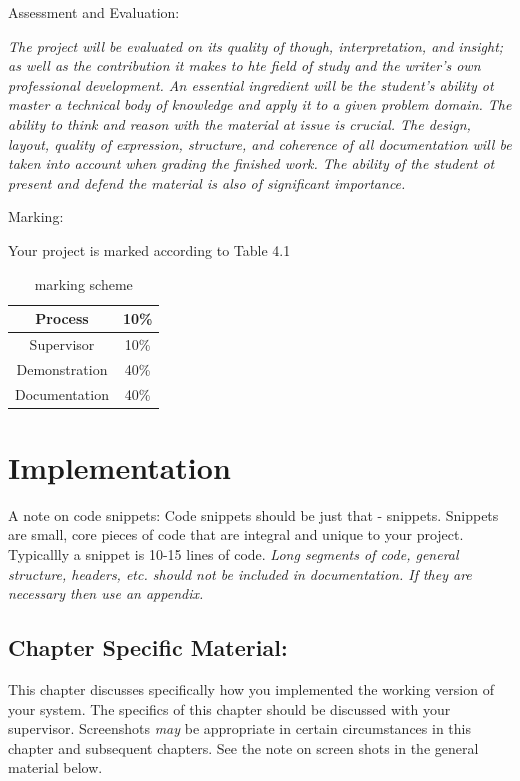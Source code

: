 \documentclass{report}[a4paper,12pt,onecolumn]
\begin{document}
Assessment and Evaluation:

\textit{The project will be evaluated on its quality of though, interpretation, 
and insight; as well as the contribution it makes to hte field of study and the 
writer's own professional development. An essential ingredient will be the 
student's ability ot master a technical body of knowledge and apply it to a 
given problem domain. The ability to think and reason with the material at 
issue is crucial. The design, layout, quality of expression, structure, and 
coherence of all documentation will be taken into account when grading the 
finished work. The ability of the student ot present and defend the material is 
also of significant importance.}

Marking:

Your project is marked according to Table 4.1

\begin{table}
    \begin{center}
        \begin{tabular}{ |c|c| }
            \hline
            Process & 10\% \\
            \hline
            Supervisor & 10\% \\
            \hline
            Demonstration & 40\% \\
            \hline
            Documentation & 40\% \\
            \hline
        \end{tabular}
    \end{center}
    \caption{marking scheme}
\end{table}

\chapter{Implementation}

A note on code snippets: Code snippets should be just that - snippets. Snippets 
are small, core pieces of code that are integral and unique to your project. 
Typicallly a snippet is 10-15 lines of code. \textit{Long segments of code, 
general structure, headers, etc. should not be included in documentation. If 
they are necessary then use an appendix.}

\section{Chapter Specific Material:}

This chapter discusses specifically how you implemented the working version of 
your system. The specifics of this chapter should be discussed with your 
supervisor. Screenshots \textit{may} be appropriate in certain circumstances in 
this chapter and subsequent chapters. See the note on screen shots in the 
general material below.
\end{document}
